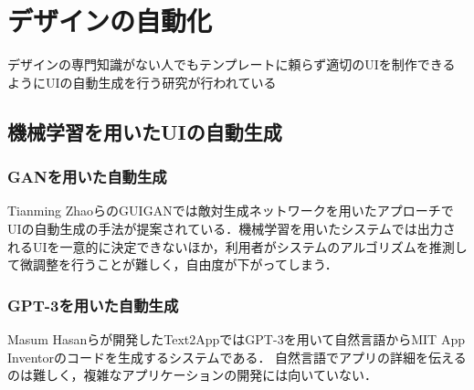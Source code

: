 \section{デザインの自動化}
デザインの専門知識がない人でもテンプレートに頼らず適切のUIを制作できるようにUIの自動生成を行う研究が行われている
\subsection{機械学習を用いたUIの自動生成}
\subsubsection{GANを用いた自動生成}
Tianming ZhaoらのGUIGAN\cite{2021guigan}では敵対生成ネットワークを用いたアプローチでUIの自動生成の手法が提案されている．機械学習を用いたシステムでは出力されるUIを一意的に決定できないほか，利用者がシステムのアルゴリズムを推測して微調整を行うことが難しく，自由度が下がってしまう．
\subsubsection{GPT-3を用いた自動生成}
Masum Hasanらが開発したText2App\cite{text2app}ではGPT-3を用いて自然言語からMIT App Inventorのコードを生成するシステムである．
自然言語でアプリの詳細を伝えるのは難しく，複雑なアプリケーションの開発には向いていない．

